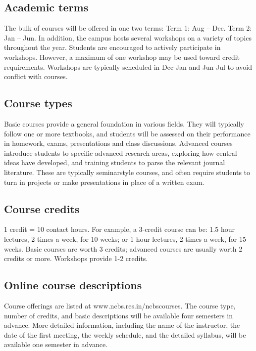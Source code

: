 \documentclass[a4paper,10pt]{article}
\begin{document}
\subsection{Academic terms}
The bulk of courses will be offered in one two terms: Term 1: Aug – Dec.
Term 2: Jan – Jun. In addition, the campus hosts several workshops on a variety of topics
throughout the year. Students are encouraged to actively participate in workshops. However,
a maximum of one workshop may be used toward credit requirements. Workshops are
typically scheduled in Dec-Jan and Jun-Jul to avoid conflict with courses.

\subsection{Course types} Basic courses provide a general foundation in various
fields. They will typically follow one or more textbooks, and students will be
assessed on their performance in homework, exams, presentations and class
discussions. Advanced courses introduce students to specific advanced research
areas, exploring how central ideas have developed, and training students to
parse the relevant journal literature. These are typically seminarstyle courses,
and often require students to turn in projects or make presentations in place of
a written exam.

\subsection{Course credits} 
1 credit = 10 contact hours. For example, a 3-credit course can be: 1.5 hour
lectures, 2 times a week, for 10 weeks; or 1 hour lectures, 2 times a week, for 15 weeks.
Basic courses are worth 3 credits; advanced courses are usually worth 2 credits or more.
Workshops provide 1-2 credits.

\subsection{Online course descriptions}
Course offerings are listed at www.ncbs.res.in/ncbscourses.
The course type, number of credits, and basic descriptions will be available four semesters
in advance. More detailed information, including the name of the instructor, the date of the
first meeting, the weekly schedule, and the detailed syllabus, will be available one semester
in advance.
\end{document}
